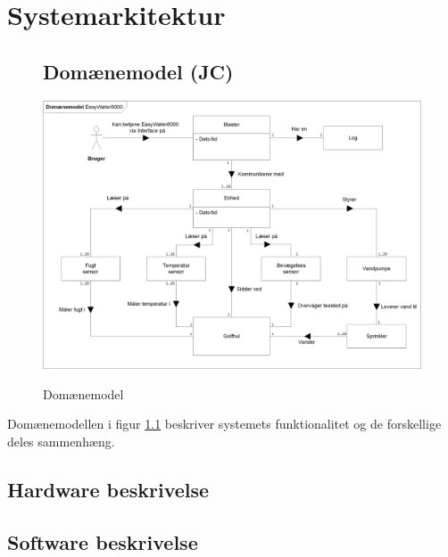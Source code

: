 \chapter{Systemarkitektur}

\begin{figure}[htbp] \centering
\section{Domænemodel (JC)}
{\includegraphics[width=\textwidth]{filer/systemarkitektur/Domainmodel}}
\caption{Domænemodel}
\label{lab:domainmodel}
\end{figure}
Domænemodellen i figur \ref{lab:domainmodel} beskriver systemets funktionalitet og de forskellige deles sammenhæng. 

\newpage
\section{Hardware beskrivelse}


\clearpage
\section{Software beskrivelse}
